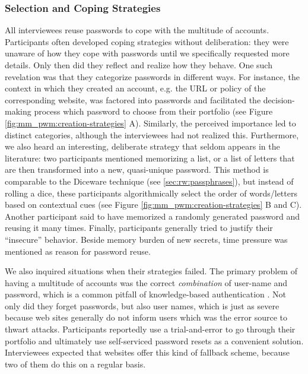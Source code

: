 \subsubsection{Selection and Coping Strategies}
All interviewees reuse passwords to cope with the multitude of accounts. Participants often developed coping strategies without deliberation: they were unaware of how they cope with passwords until we specifically requested more details. Only then did they reflect and realize how they behave. One such revelation was that they categorize passwords in different ways. For instance, the context in which they created an account, e.g. the URL or policy of the corresponding website, was factored into passwords and facilitated the decision-making process which password to choose from their portfolio (see Figure \ref{fig:mm_pwm:creation-strategies} A). Similarly, the perceived importance led to distinct categories, although the interviewees had not realized this. Furthermore, we also heard an interesting, deliberate strategy that seldom appears in the literature: two participants mentioned memorizing a list, or a list of letters that are then transformed into a new, quasi-unique password. This method is comparable to the Diceware technique (see \ref{sec:rw:passphrases}), but instead of rolling a dice, these participants algorithmically select the order of words/letters based on contextual cues (see Figure \ref{fig:mm_pwm:creation-strategies} B and C). Another participant said to have memorized a randomly generated password and reusing it many times. Finally, participants generally tried to justify their ``insecure'' behavior. Beside memory burden of new secrets, time pressure was mentioned as reason for password reuse. 

We also inquired situations when their strategies failed. The primary problem of having a multitude of accounts was the correct \textit{combination} of user-name and password, which is a common pitfall of knowledge-based authentication \cite{Stobert2014PasswordLifeCycle}. Not only did they forget passwords, but also user names, which is just as severe because web sites generally do not inform users which was the error source to thwart attacks. Participants reportedly use a trial-and-error to go through their portfolio and ultimately use self-serviced password resets as a convenient solution. Interviewees expected that websites offer this kind of fallback scheme, because two of them do this on a regular basis. 

